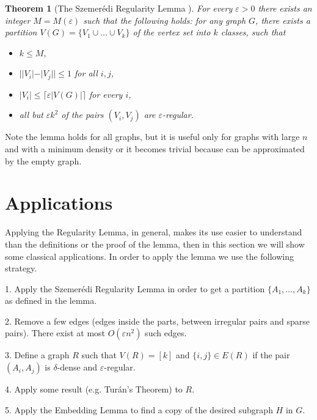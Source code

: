 \documentclass[12pt,twoside,a4paper,bibliography=totocnumbered]{book}
\numberwithin{equation}{section}
\newtheorem{theorem}             {Theorem}[section]
\theoremstyle{remark}
\begin{document}
\begin{theorem}[{The Szemerédi Regularity Lemma \cite{Sz75}}]\label{theorem:Sz}For every $\varepsilon > 0$ there exists an integer $M=M(\varepsilon)$ such that the following holds: for any graph $G$, there exists a partition $V(G) = \{V_1 \cup \ldots \cup V_k\}$ of the vertex set into $k$ classes, such that
\begin{itemize}

	\item $k \leq M$,
	\item $||V_i|-|V_j|| \leq 1$ for all $i,j$,
	
	\item $|V_i| \leq \lceil\varepsilon|V(G)|\rceil$ for every $i$,
	\item all but $\varepsilon k^2$ of the pairs $(V_i, V_j)$ are $\varepsilon$-regular. 
\end{itemize}
\end{theorem}

Note the lemma holds for all graphs, but it is useful only for graphs with large $n$ and with a minimum density or it becomes trivial because can be approximated by the empty graph.%

\section{Applications}
Applying the Regularity Lemma, in general, makes its use easier to understand than the definitions or the proof of the lemma, then in this section we will show some classical applications. In order to apply the lemma we use the following strategy.

1. Apply the Szemerédi Regularity Lemma in order to get a partition $ \{ A_1, \ldots ,A_k \} $ as defined in the lemma.

2. Remove a few edges (edges inside the parts, between irregular pairs and sparse pairs). There exist at most $O(\varepsilon n^2)$ such edges.

3. Define a graph $R$ such that $V(R) = [k]$ and $\{i,j\} \in E(R) $ if  the pair $(A_i, A_j)$ is $\delta$-dense and $\varepsilon$-regular.

4. Apply some result (e.g. Turán's Theorem) to $R$.

5. Apply the Embedding Lemma to find a copy of the desired subgraph $H$ in $G$.
\end{document}
